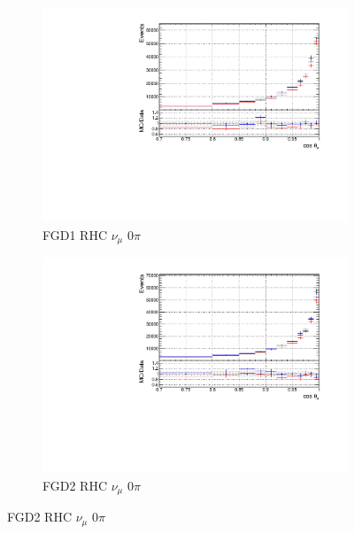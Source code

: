 \begin{figure}[!h]
\begin{subfigure}{0.49\textwidth}
  \centering
  \includegraphics[width=\textwidth]{figs/priorpred1D_t_FGD1_NuMuBkg_CC0pi_in_AntiNu_Mode}
  \caption{FGD1 RHC $\nu_{\mu}$ 0$\pi$}
\end{subfigure}
\begin{subfigure}{0.49\textwidth}
  \centering
  \includegraphics[width=\textwidth]{figs/priorpred1D_t_FGD2_NuMuBkg_CC0pi_in_AntiNu_Mode}
  \caption{FGD2 RHC $\nu_{\mu}$ 0$\pi$}
\end{subfigure}


\end{figure}
